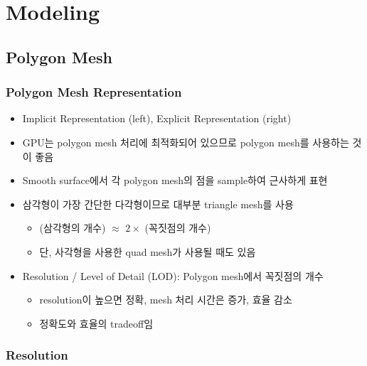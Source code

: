 \section{Modeling}

\subsection{Polygon Mesh}

\subsubsection*{Polygon Mesh Representation}
\begin{itemize}
    \item Implicit Representation (left), Explicit Representation (right)
    \item GPU는 polygon mesh 처리에 최적화되어 있으므로 polygon mesh를 사용하는 것이 좋음
    \item Smooth surface에서 각 polygon mesh의 점을 sample하여 근사하게 표현
    \item 삼각형이 가장 간단한 다각형이므로 대부분 triangle mesh를 사용
    \begin{itemize}
        \item (삼각형의 개수) $\approx$ $2 \times $ (꼭짓점의 개수)
        \item 단, 사각형을 사용한 quad mesh가 사용될 때도 있음
    \end{itemize}
    \item Resolution / Level of Detail (LOD): Polygon mesh에서 꼭짓점의 개수
    \begin{itemize}
        \item resolution이 높으면 정확, mesh 처리 시간은 증가, 효율 감소
        \item 정확도와 효율의 tradeoff임
    \end{itemize}
\end{itemize}

\subsubsection*{Resolution}
